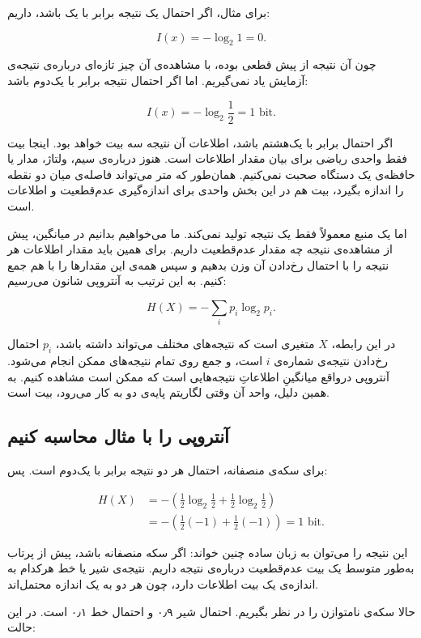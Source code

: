 برای مثال، اگر احتمال یک نتیجه برابر با یک باشد، داریم:

\[
I(x)=-\log_2 1=0.
\]

چون آن نتیجه از پیش قطعی بوده، با مشاهده‌ی آن چیز تازه‌ای درباره‌ی نتیجه‌ی آزمایش یاد نمی‌گیریم. اما اگر احتمال نتیجه برابر با یک‌دوم باشد:

\[
I(x)=-\log_2 \frac{1}{2}=1 \text{ bit}.
\]

اگر احتمال برابر با یک‌هشتم باشد، اطلاعات آن نتیجه سه بیت خواهد بود. اینجا بیت فقط واحدی ریاضی برای بیان مقدار اطلاعات است. هنوز درباره‌ی سیم، ولتاژ، مدار یا حافظه‌ی یک دستگاه صحبت نمی‌کنیم. همان‌طور که متر می‌تواند فاصله‌ی میان دو نقطه را اندازه بگیرد، بیت هم در این بخش واحدی برای اندازه‌گیری عدم‌قطعیت و اطلاعات است.

اما یک منبع معمولاً فقط یک نتیجه تولید نمی‌کند. ما می‌خواهیم بدانیم در میانگین، پیش از مشاهده‌ی نتیجه چه مقدار عدم‌قطعیت داریم. برای همین باید مقدار اطلاعات هر نتیجه را با احتمال رخ‌دادن آن وزن بدهیم و سپس همه‌ی این مقدارها را با هم جمع کنیم. به این ترتیب به آنتروپی شانون می‌رسیم:

\[
H(X)=-\sum_i p_i\log_2 p_i.
\]

در این رابطه، \(X\) متغیری است که نتیجه‌های مختلف می‌تواند داشته باشد، \(p_i\) احتمال رخ‌دادن نتیجه‌ی شماره‌ی \(i\) است، و جمع روی تمام نتیجه‌های ممکن انجام می‌شود. آنتروپی درواقع میانگینِ اطلاعاتِ نتیجه‌هایی است که ممکن است مشاهده کنیم. به همین دلیل، واحد آن وقتی لگاریتم پایه‌ی دو به کار می‌رود، بیت است. \autocite{shannon1948,cover2006}

\subsection{آنتروپی را با مثال محاسبه کنیم}
\label{sub:entropy-examples}

برای سکه‌ی منصفانه، احتمال هر دو نتیجه برابر با یک‌دوم است. پس:

\[
\begin{aligned}
H(X) &= -\left(\frac12\log_2\frac12+\frac12\log_2\frac12\right)\\
&= -\left(\frac12(-1)+\frac12(-1)\right)=1\text{ bit}.
\end{aligned}
\]

این نتیجه را می‌توان به زبان ساده چنین خواند: اگر سکه منصفانه باشد، پیش از پرتاب به‌طور متوسط یک بیت عدم‌قطعیت درباره‌ی نتیجه داریم. نتیجه‌ی شیر یا خط هرکدام به اندازه‌ی یک بیت اطلاعات دارد، چون هر دو به یک اندازه محتمل‌اند.

حالا سکه‌ی نامتوازن را در نظر بگیریم. احتمال شیر ۰٫۹ و احتمال خط ۰٫۱ است. در این حالت:

